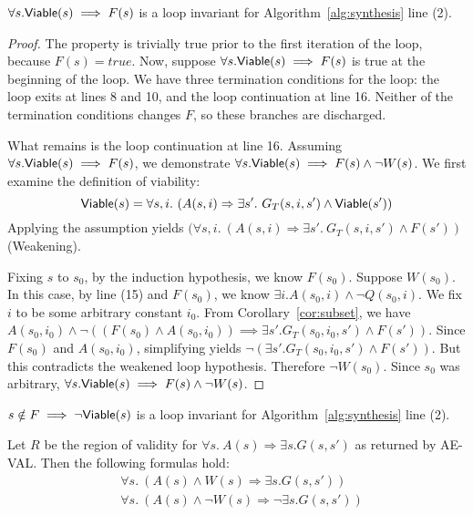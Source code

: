 \begin{lemma}
$\forall s. {\mathsf {Viable}}(s) \implies F(s)$ is a loop invariant for Algorithm~\ref{alg:synthesis} line (2).
\label{lem:alg1-viable}
\end{lemma}

\begin{proof}
The property is trivially true prior to the first iteration of the loop, because
$F(s) = true$.  Now, suppose $\forall s . {\mathsf {Viable}}(s) \implies F(s)$ is true at the beginning of the loop.  We have three termination conditions for the loop: the loop exits at lines 8 and 10, and the loop continuation at line 16.  Neither of the termination conditions changes $F$, so these branches are discharged.

What remains is the loop continuation at line 16.  Assuming $\forall s . {\mathsf {Viable}}(s) \implies F(s)$, we demonstrate $\forall s . {\mathsf {Viable}}(s) \implies F(s) \land \lnot W(s)$.  We first examine the definition of viability:
\[
    \viable(s) = \forall s,i. \ (A(s, i) \Rightarrow \exists s'.~ G_T(s, i,s') \land \viable(s'))
\]
Applying the assumption yields $(\forall s,i. \ (A(s, i) \Rightarrow \exists s'.~ G_T(s, i,s') \land F(s'))$ (Weakening).

Fixing $s$ to $s_0$, by the induction hypothesis, we know $F(s_0)$.  Suppose $W(s_0)$.  In this case, by line (15) and $F(s_0)$, we know $\exists i. A(s_0, i) \land \lnot Q(s_0, i)$.  We fix $i$ to be some arbitrary constant $i_0$.  From Corollary~\ref{cor:subset}, we have
$A(s_0, i_0) \land \lnot ((F(s_0) \land A(s_0,i_0)) \implies \exists s'.G_{T}(s_0,i_0,s') \land F(s'))$.  Since $F(s_0)$ and $A(s_0, i_0)$, simplifying
yields $\lnot (\exists s'.G_{T}(s_0,i_0,s') \land F(s'))$.  But this contradicts the weakened loop hypothesis.  Therefore $\lnot W(s_0)$.  Since $s_0$ was arbitrary, $\forall s . {\mathsf {Viable}}(s) \implies F(s) \land \lnot W(s)$.
\end{proof}

\begin{corollary}
$s \notin F \implies \lnot {\mathsf {Viable}}(s)$ is a loop invariant for Algorithm~\ref{alg:synthesis} line (2).
\label{cor:alg1-nonviable}
\end{corollary}
\fi

\begin{lemma}
  Let $R$ be the region of validity for $\forall s.~ A(s) \Rightarrow
  \exists s. G(s, s')$ as returned by AE-VAL. Then the following
  formulas hold:
  \begin{align*}
  &\forall s.~ (A(s) \land W(s) \Rightarrow \exists s. G(s, s')) \\
  &\forall s.~ (A(s) \land \neg W(s) \Rightarrow \neg \exists s. G(s, s')) \\
  \end{align*}
\end{lemma}

